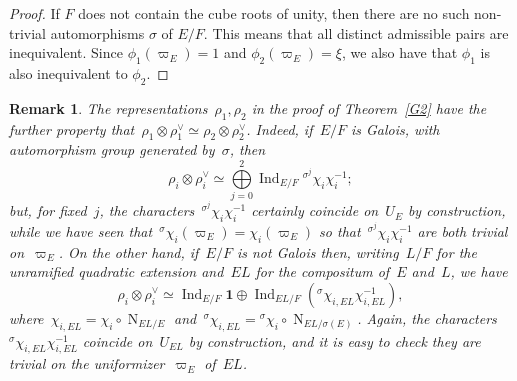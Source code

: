 \documentclass[12pt]{amsart}
\newcommand{\Ind}{\operatorname{Ind}}
\newcommand{\N}{\operatorname{N}}
\newcommand{\ts}{\textstyle}
\def\boI{\boldsymbol 1}
\newtheorem{rmk}[thm]{Remark}
\newtheorem{rmk}[equation]{Remark}
\begin{document}
\begin{proof}
If $F$ does not contain the cube roots of unity, then there are no such non-trivial automorphisms $\sigma$ of $E/F$.  This means that all distinct admissible pairs are inequivalent.  Since $\phi_1(\varpi_E) = 1$ and $\phi_2(\varpi_E) = \xi$, we also have that $\phi_1$ is also inequivalent to $\phi_2$. 
\fi
\end{proof}

\begin{rmk}\label{rem:G2}
The representations~$\rho_1,\rho_2$ in the proof of Theorem~\ref{G2} have the further property that~$\rho_1\otimes\rho_1^\vee \simeq \rho_2\otimes\rho_2^\vee$. Indeed, if~$E/F$ is Galois, with automorphism group generated by~$\sigma$, then
\[
\rho_i\otimes\rho_i^\vee \simeq {\ts \bigoplus\limits_{j=0}^2} \Ind_{E/F} {}^{\sigma^j}\chi_i\chi_i^{-1};
\]
but, for fixed~$j$, the characters~${}^{\sigma^j}\chi_i\chi_i^{-1}$ certainly coincide on~$U_E$ by construction, while we have seen that~${}^\sigma\chi_i(\varpi_E)=\chi_i(\varpi_E)$ so that~${}^{\sigma^j}\chi_i\chi_i^{-1}$ are both trivial on~$\varpi_E$. On the other hand, if~$E/F$ is not Galois then, writing~$L/F$ for the unramified quadratic extension and~$EL$ for the compositum of~$E$ and~$L$, we have
\[
\rho_i\otimes\rho_i^\vee \simeq \Ind_{E/F} \boI \oplus \Ind_{EL/F} \left({}^\sigma\chi_{i,EL}\chi_{i,EL}^{-1}\right),
\]
where~$\chi_{i,EL}=\chi_i\circ\N_{EL/E}$ and~${}^\sigma\chi_{i,EL}={}^\sigma\chi_i\circ\N_{EL/\sigma(E)}$. Again, the characters~${}^\sigma\chi_{i,EL}\chi_{i,EL}^{-1}$ coincide on~$U_{EL}$ by construction, and it is easy to check they are trivial on the uniformizer~$\varpi_E$ of~$EL$.


\end{rmk}
\end{document}

